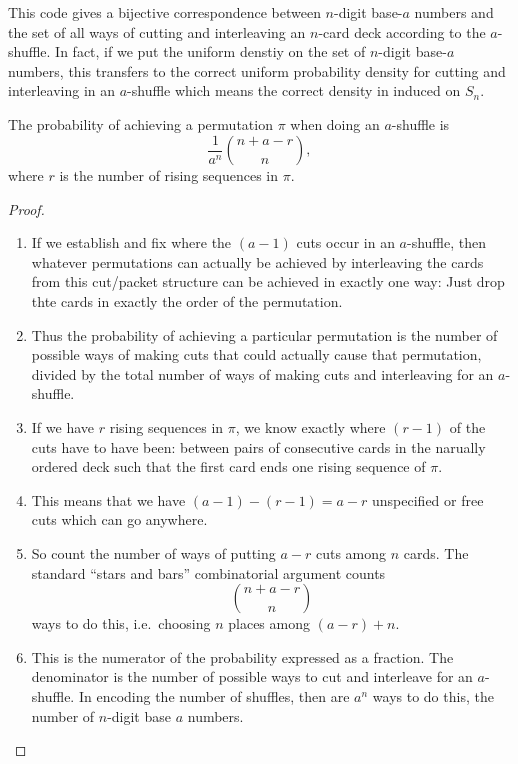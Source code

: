 \documentclass[12pt]{article}
\begin{document}
This code gives a bijective correspondence between \( n \)-digit base-\(
a \) numbers and the set of all ways of cutting and interleaving an \( n
\)-card deck according to the \( a \)-shuffle.  In fact, if we put the
uniform denstiy on the set of \( n \)-digit base-\( a \) numbers, this
transfers to the correct uniform probability density for cutting and
interleaving in an \( a \)-shuffle which means the correct density in
induced on \( S_n \).

\begin{theorem}
    The probability of achieving a permutation \( \pi \) when doing an \(
    a \)-shuffle is
    \[
        \frac{1}{a^n} \binom{n + a - r}{n},
    \] where \( r \) is the number of rising sequences in \( \pi \).
\end{theorem}

\begin{proof}
    \begin{enumerate}
        \item
            If we establish and fix where the \( (a-1) \) cuts occur in
            an \( a \)-shuffle, then whatever permutations can actually
            be achieved by interleaving the cards from this cut/packet
            structure can be achieved in exactly one way:  Just drop
            thte cards in exactly the order of the permutation.
        \item
            Thus the probability of achieving a particular permutation
            is the number of possible ways of making cuts that could
            actually cause that permutation, divided by the total number
            of ways of making cuts and interleaving for an \( a \)-shuffle.
        \item
            If we have \( r \) rising sequences in \( \pi \), we know
            exactly where \( (r-1) \) of the cuts have to have been:
            between pairs of consecutive cards in the narually ordered
            deck such that the first card ends one rising sequence of \(
            \pi \).
        \item
            This means that we have \( (a-1) - (r-1) = a-r \)
            unspecified or free cuts which can go anywhere.
        \item
            So count the number of ways of putting \( a-r \) cuts among \(
            n \) cards.  The standard ``stars and bars'' combinatorial
            argument counts
            \[
                \binom{n + a-r}{n}
            \] ways to do this, i.e.\ choosing \( n \) places among \( (a-r)
            + n \).
        \item
            This is the numerator of the probability expressed as a
            fraction.  The denominator is the number of possible ways to
            cut and interleave for an \( a \)-shuffle.  In encoding the
            number of shuffles, then are \( a^n \) ways to do this, the
            number of \( n \)-digit base \( a \) numbers.
    \end{enumerate}
\end{proof}
\end{document}
